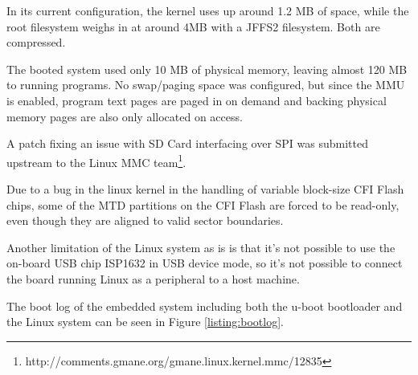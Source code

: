 In its current configuration, the kernel uses up around 1.2 MB of space, while the root filesystem
weighs in at around 4MB with a JFFS2 filesystem. Both are compressed.

The booted system used only 10 MB of physical memory, leaving almost 120 MB to running programs. No
swap/paging space was configured, but since the MMU is enabled, program text pages are paged in
on demand and backing physical memory pages are also only allocated on access.

A patch fixing an issue with SD Card interfacing over SPI was submitted upstream to the Linux
MMC team\footnote{http://comments.gmane.org/gmane.linux.kernel.mmc/12835}.

Due to a bug in the linux kernel in the handling of variable block-size CFI Flash chips,
some of the MTD partitions on the CFI Flash are forced to be read-only, even though they
are aligned to valid sector boundaries.

Another limitation of the Linux system as is is that it's not possible to use the on-board
USB chip ISP1632 in USB device mode, so it's not possible to connect the board running Linux
as a peripheral to a host machine.

The boot log of the embedded system including both the u-boot bootloader and the Linux system
can be seen in Figure \ref{listing:bootlog}.


